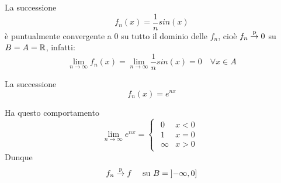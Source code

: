 \begin{example}
	La successione
	\[f_n(x)=\frac{1}{n}sin(x)\]
	è puntualmente convergente a $0$ su tutto il dominio delle $f_n$, cioè $f_n \overset{\text{p}}{\to} 0$ su $B = A = \mathbb{R}$, infatti:
	\[
		\lim\limits_{n \to \infty} f_n(x) = \lim\limits_{n \to \infty} \frac{1}{n} sin(x) = 0 \quad \forall x \in A
	\]
\end{example}
\begin{example}
	La successione
	\[f_n(x)=e^{nx}\]
	\begin{center}
	\end{center}
	Ha questo comportamento
	\[
		\lim\limits_{n \to \infty} e^{nx} =
		\begin{cases}
			\begin{array}{ll}
				0 & x<0\\
				1 & x=0\\
				\infty & x>0
			\end{array}
		\end{cases}
	\]
	Dunque
	\[f_n \overset{\text{p}}{\to} f\quad \text{ su } B = \left]-\infty,0\right]\]
\end{example}

